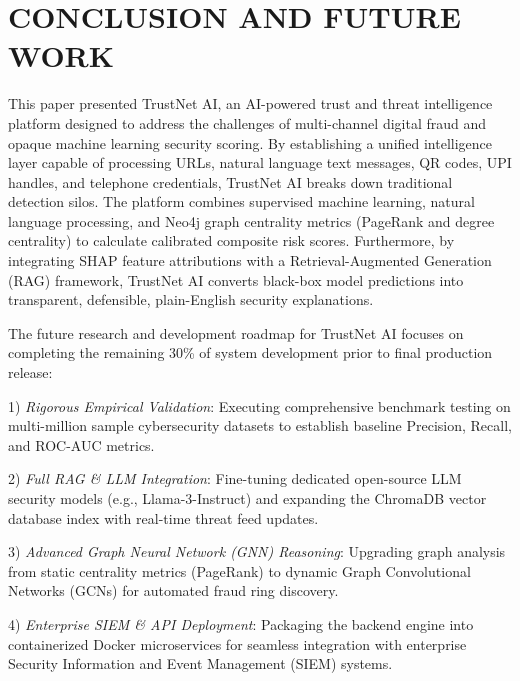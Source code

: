 \documentclass[conference,a4paper]{IEEEtran}
\begin{document}
\section{CONCLUSION AND FUTURE WORK}
This paper presented TrustNet AI, an AI-powered trust and threat intelligence platform designed to address the challenges of multi-channel digital fraud and opaque machine learning security scoring. By establishing a unified intelligence layer capable of processing URLs, natural language text messages, QR codes, UPI handles, and telephone credentials, TrustNet AI breaks down traditional detection silos. The platform combines supervised machine learning, natural language processing, and Neo4j graph centrality metrics (PageRank and degree centrality) to calculate calibrated composite risk scores. Furthermore, by integrating SHAP feature attributions with a Retrieval-Augmented Generation (RAG) framework, TrustNet AI converts black-box model predictions into transparent, defensible, plain-English security explanations.

The future research and development roadmap for TrustNet AI focuses on completing the remaining 30\% of system development prior to final production release:

1) \textit{Rigorous Empirical Validation}: Executing comprehensive benchmark testing on multi-million sample cybersecurity datasets to establish baseline Precision, Recall, and ROC-AUC metrics.

2) \textit{Full RAG \& LLM Integration}: Fine-tuning dedicated open-source LLM security models (e.g., Llama-3-Instruct) and expanding the ChromaDB vector database index with real-time threat feed updates.

3) \textit{Advanced Graph Neural Network (GNN) Reasoning}: Upgrading graph analysis from static centrality metrics (PageRank) to dynamic Graph Convolutional Networks (GCNs) for automated fraud ring discovery.

4) \textit{Enterprise SIEM \& API Deployment}: Packaging the backend engine into containerized Docker microservices for seamless integration with enterprise Security Information and Event Management (SIEM) systems.
\end{document}
